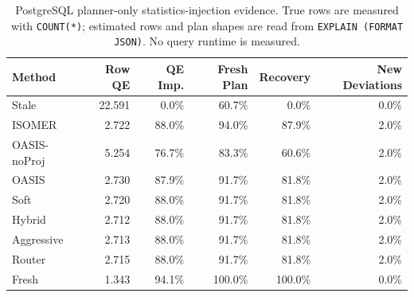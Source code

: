 \begin{table}[t]
  \centering
  \small
  \caption{PostgreSQL planner-only statistics-injection evidence. True rows are measured with \texttt{COUNT(*)}; estimated rows and plan shapes are read from \texttt{EXPLAIN (FORMAT JSON)}. No query runtime is measured.}
  \label{tab:postgres_planner_stats_injection}
  \setlength{\tabcolsep}{4pt}
  \begin{tabular}{lrrrrr}
    \toprule
    Method & Row QE & QE Imp. & Fresh Plan & Recovery & New Deviations \\
    \midrule
    Stale & 22.591 & 0.0\% & 60.7\% & 0.0\% & 0.0\% \\
    ISOMER & 2.722 & 88.0\% & 94.0\% & 87.9\% & 2.0\% \\
    OASIS-noProj & 5.254 & 76.7\% & 83.3\% & 60.6\% & 2.0\% \\
    OASIS & 2.730 & 87.9\% & 91.7\% & 81.8\% & 2.0\% \\
    Soft & 2.720 & 88.0\% & 91.7\% & 81.8\% & 2.0\% \\
    Hybrid & 2.712 & 88.0\% & 91.7\% & 81.8\% & 2.0\% \\
    Aggressive & 2.713 & 88.0\% & 91.7\% & 81.8\% & 2.0\% \\
    Router & 2.715 & 88.0\% & 91.7\% & 81.8\% & 2.0\% \\
    Fresh & 1.343 & 94.1\% & 100.0\% & 100.0\% & 0.0\% \\
    \bottomrule
  \end{tabular}
\end{table}
